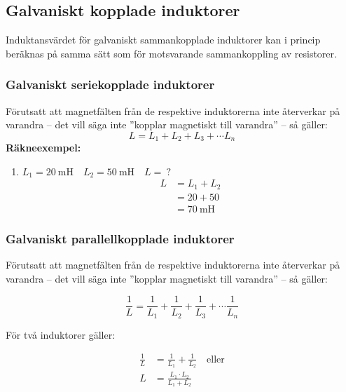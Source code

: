 \subsection{Galvaniskt kopplade induktorer}
\label{galvaniskt_kopplade_induktorer}

Induktansvärdet för galvaniskt sammankopplade induktorer kan i princip
beräknas på samma sätt som för motsvarande sammankoppling av resistorer.

\subsubsection{Galvaniskt seriekopplade induktorer}

Förutsatt att magnetfälten från de respektive induktorerna inte återverkar på
varandra -- det vill säga inte ''kopplar magnetiskt till varandra'' -- så
gäller:
%
\[L = L_1 + L_2 + L_3 + \cdots L_n\]
%
\noindent
\textbf{Räkneexempel:}
\begin{enumerate}
\item \(L_1 = \SI{20}{\milli\henry} \quad L_2 = \SI{50}{\milli\henry} \quad L =\ ?\)
\begin{align*}
  L &= L_1 + L_2 \\[1ex]
  & = 20 + 50 \\[1ex]
  &= \SI{70}{\milli\henry}
\end{align*}
\end{enumerate}

\subsubsection{Galvaniskt parallellkopplade induktorer}

Förutsatt att magnetfälten från de respektive induktorerna inte återverkar på
varandra -- det vill säga inte ''kopplar magnetiskt till varandra'' -- så
gäller:

\[
\frac{1}{L} = \frac{1}{L_1} + \frac{1}{L_2} + \frac{1}{L_3} +
\cdots \frac{1}{L_n}
\]

För två induktorer gäller:

\begin{align*}
  \frac{1}{L} &= \frac{1}{L_1} + \frac{1}{L_2} \quad \text{eller} \\
  L &= \frac{L_1 \cdot L_2}{L_1 + L_2}
\end{align*}

